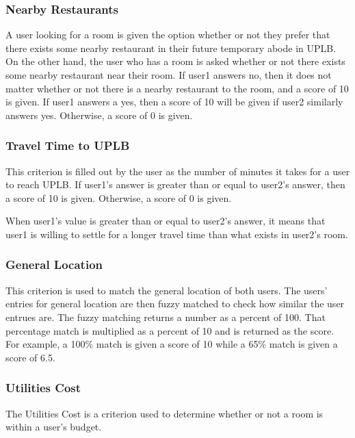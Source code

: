 \documentclass[journal]{./IEEE/IEEEtran}
\begin{document}
    \subsubsection{Nearby Restaurants}
        A user looking for a room is given the option whether or not they prefer that there exists some nearby
        restaurant in their future temporary abode in UPLB. On the other hand, the user who has a room is asked whether
        or not there exists some nearby restaurant near their room. If user1 answers no, then it does not matter whether
        or not there is a nearby restaurant to the room, and a score of 10 is given. If user1 answers a yes, then a
        score of 10 will be given if user2 similarly answers yes. Otherwise, a score of 0 is given.

    \subsubsection{Travel Time to UPLB}
        This criterion is filled out by the user as the number of minutes it takes for a user to reach UPLB.
        If user1's answer is greater than or equal to user2's answer, then a score of 10 is given. Otherwise, a score of
        0 is given. 

        When user1's value is greater than or equal to user2's answer, it means that user1 is willing to settle for a
        longer travel time than what exists in user2's room.

    \subsubsection{General Location}
        This criterion is used to match the general location of both users. The users' entries for general location are
        then fuzzy matched to check how similar the user entrues are. The fuzzy matching returns a number as a percent
        of 100. That percentage match is multiplied as a percent of 10 and is returned as the score. For example, a 100\% match is
        given a score of 10 while a 65\% match is given a score of 6.5.

    \subsubsection{Utilities Cost}
        The Utilities Cost is a criterion used to determine whether or not a room is within a user's budget.
\end{document}
